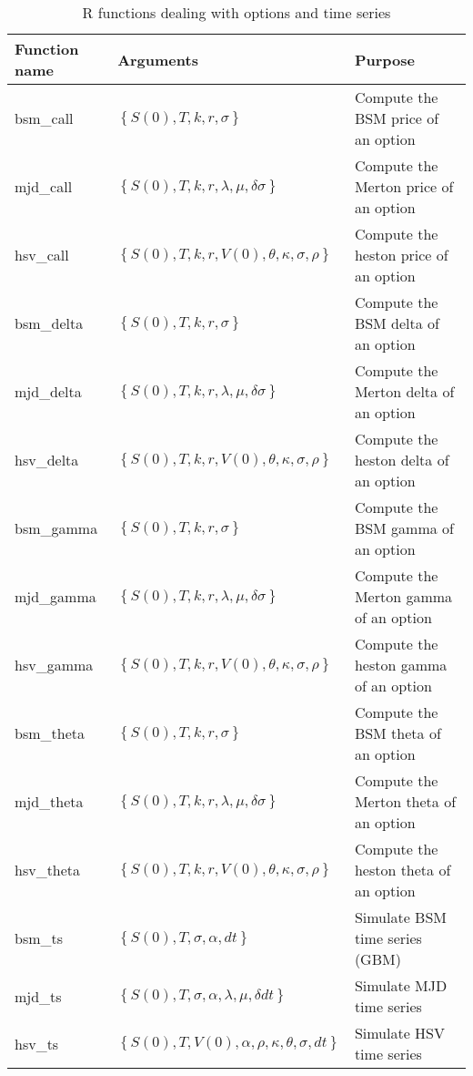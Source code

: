 \documentclass[12pt,a4paper]{report}
\begin{document}
\begin{appendices}
\begin{table}[ht]
  \begin{tabularx}{\textwidth}{llX}
    \hline
    Function name & Arguments & Purpose \\
    \hline
    bsm\_call & $\left \{ S(0), T, k, r, \sigma \right \}$ & Compute the BSM price of an option \\
    mjd\_call & $\left \{ S(0), T, k, r, \lambda, \mu, \delta \sigma \right \}$ & Compute the Merton price of an option \\
    hsv\_call & $\left \{ S(0), T, k, r, V(0), \theta, \kappa, \sigma, \rho \right \}$ & Compute the heston price of an option \\
    bsm\_delta & $\left \{ S(0), T, k, r, \sigma \right \}$ & Compute the BSM delta of an option \\
    mjd\_delta & $\left \{ S(0), T, k, r, \lambda, \mu, \delta \sigma \right \}$ & Compute the Merton delta of an option \\
    hsv\_delta & $\left \{ S(0), T, k, r, V(0), \theta, \kappa, \sigma, \rho \right \}$ & Compute the heston delta of an option \\
    bsm\_gamma & $\left \{ S(0), T, k, r, \sigma \right \}$ & Compute the BSM gamma of an option \\
    mjd\_gamma & $\left \{ S(0), T, k, r, \lambda, \mu, \delta \sigma \right \}$ & Compute the Merton gamma of an option \\
    hsv\_gamma & $\left \{ S(0), T, k, r, V(0), \theta, \kappa, \sigma, \rho \right \}$ & Compute the heston gamma of an option \\
    bsm\_theta & $\left \{ S(0), T, k, r, \sigma \right \}$ & Compute the BSM theta of an option \\
    mjd\_theta & $\left \{ S(0), T, k, r, \lambda, \mu, \delta \sigma \right \}$ & Compute the Merton theta of an option \\
    hsv\_theta & $\left \{ S(0), T, k, r, V(0), \theta, \kappa, \sigma, \rho \right \}$ & Compute the heston theta of an option \\
    bsm\_ts & $\left \{ S(0), T, \sigma, \alpha, dt \right \}$ & Simulate BSM time series (GBM) \\
    mjd\_ts & $\left \{ S(0), T, \sigma, \alpha, \lambda, \mu, \delta dt \right \}$ & Simulate MJD time series \\
    hsv\_ts & $\left \{ S(0), T, V(0), \alpha, \rho, \kappa, \theta, \sigma, dt \right \}$ & Simulate HSV time series \\
  \end{tabularx}
  \caption{R functions dealing with options and time series}
  \label{t:append:function:r}
\end{table}


\end{appendices}
\end{document}

